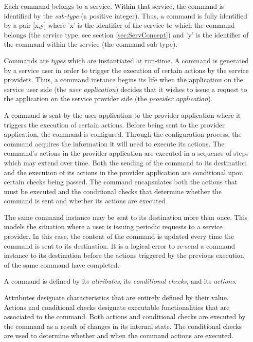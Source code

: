 Each command belongs to a service. 
Within that service, the command is identified by the \textit{sub-type} (a positive integer). 
Thus, a command is fully identified by a pair [x,y] where 'x' is the identifier of the service to which the command belongs (the service type, see section \ref{sec:ServConcept}) and 'y' is the identifier of the command within the service (the command sub-type).

Commands are \textit{types} which are instantiated at run-time. 
A command is generated by a service user in order to trigger the execution of certain actions by the service providers. Thus, a command instance begins its life when the application on the service user side (the \textit{user application}) decides that it wishes to issue a request to the application on the service provider side (the \textit{provider application}). 

A command is sent by the user application to the provider application where it triggers the execution of certain actions. Before being sent to the provider application, the command is configured. Through the configuration process, the command acquires the information it will need to execute its actions. The command's actions in the provider application are executed in a sequence of steps which may extend over time. Both the sending of the command to its destination and the execution of its actions in the provider application are conditional upon certain checks being passed. The command encapsulates both the actions that must be executed and the conditional checks that determine whether the command is sent and whether its actions are executed.

The same command instance may be sent to its destination more than once. This models the situation where a user is issuing periodic requests to a service provider. In this case, the content of the command is updated every time the command is sent to its destination. It is a logical error to re-send a command instance to its destination before the actions triggered by the previous execution of the same command have completed.

A command is defined by its \textit{attributes}, its \textit{conditional checks}, and its \textit{actions}. 

Attributes designate characteristics that are entirely defined by their value. 
Actions and conditional checks designate executable functionalities that are associated to the command. 
Both actions and conditional checks are executed by the command as a result of changes in its internal state. 
The conditional checks are used to determine whether and when the command actions are executed.

